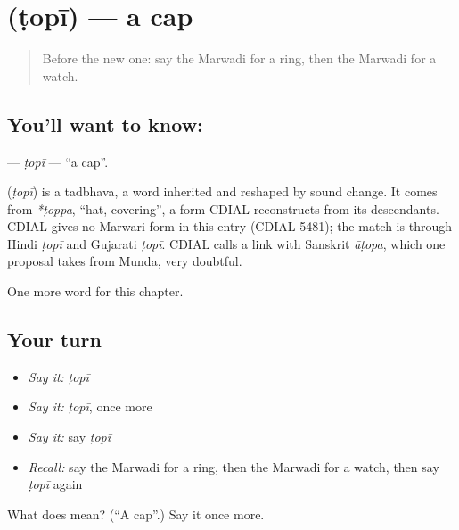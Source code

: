 \section[\texorpdfstring{\mw{टोपी} (ṭopī)}{टोपी (ṭopī)}]{ (ṭopī) — a cap}

\label{lesson:MW-C85-topi}



\begin{quote}
Before the new one: say the Marwadi for a ring, then the Marwadi for a watch.
\end{quote}

\subsection*{You'll want to know: }
\textbf{} — \emph{ṭopī} — \textquotedblleft{}a cap\textquotedblright{}.

\begin{cousinweb}
\textbf{} (\emph{ṭopī}) is a tadbhava, a word inherited and reshaped by sound change. It comes from \emph{*ṭoppa}, \textquotedblleft{}hat, covering\textquotedblright{}, a form CDIAL reconstructs from its descendants. CDIAL gives no Marwari form in this entry (CDIAL 5481); the match is through Hindi \emph{ṭopī} and Gujarati \emph{ṭopī}. CDIAL calls a link with Sanskrit \emph{āṭopa}, which one proposal takes from Munda, very doubtful.
\end{cousinweb}

\begin{grammarlens}[title={What you've built}]
One more word for this chapter.
\end{grammarlens}

\subsection*{Your turn}
\begin{itemize}
\raggedright
  \item \emph{Say it:} \emph{ṭopī}
  \item \emph{Say it:} \emph{ṭopī}, once more
  \item \emph{Say it:} say \emph{ṭopī}
  \item \emph{Recall:} say the Marwadi for a ring, then the Marwadi for a watch, then say \emph{ṭopī} again
\end{itemize}

\begin{tcolorbox}[breakable,colback=teal!4,colframe=teal!35!black,title={Before you move on}]
What does  mean? (\textquotedblleft{}A cap\textquotedblright{}.) Say it once more.
\end{tcolorbox}
